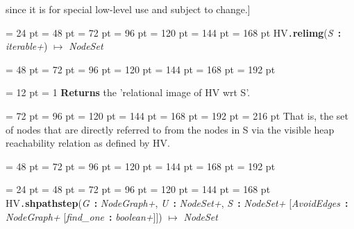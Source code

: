 {{{{{{since it is for special low-level use and subject to change.]
\par}
\par}
\par}
\par}
\par}
{\par \noindent  \leftskip = 24 pt  \leftmargini = 48 pt  \leftmarginii = 72 pt  \leftmarginiii = 96 pt  \leftmarginiv = 120 pt  \leftmarginv = 144 pt  \leftmarginvi = 168 pt HV{\tt .\/}{\bf {\large {\bf relimg\/}}\/}({\em S\/}~{\bf :}  {\em iterable+\/}) \(\mapsto \)  {\em NodeSet\/}{\par \noindent
{\par \noindent  \leftskip = 48 pt  \leftmargini = 72 pt  \leftmarginii = 96 pt  \leftmarginiii = 120 pt  \leftmarginiv = 144 pt  \leftmarginv = 168 pt  \leftmarginvi = 192 pt {\par \noindent
{\par \pagebreak[3.100000] \noindent \hangindent = 12 pt \hangafter = 1 
{\bf Returns \/} the 'relational image of HV wrt S'.\par}
{\par \noindent  \leftskip = 72 pt  \leftmargini = 96 pt  \leftmarginii = 120 pt  \leftmarginiii = 144 pt  \leftmarginiv = 168 pt  \leftmarginv = 192 pt  \leftmarginvi = 216 pt  That is, the set of nodes
that are directly referred to from the nodes in S via the visible heap
reachability relation as defined by HV.\par}
\par}
\par}
{\par \noindent  \leftskip = 48 pt  \leftmargini = 72 pt  \leftmarginii = 96 pt  \leftmarginiii = 120 pt  \leftmarginiv = 144 pt  \leftmarginv = 168 pt  \leftmarginvi = 192 pt {\par \noindent
\par}
\par}
\par}
\par}
{\par \noindent  \leftskip = 24 pt  \leftmargini = 48 pt  \leftmarginii = 72 pt  \leftmarginiii = 96 pt  \leftmarginiv = 120 pt  \leftmarginv = 144 pt  \leftmarginvi = 168 pt HV{\tt .\/}{\bf {\large {\bf shpathstep\/}}\/}({\em G\/}~{\bf :}  {\em NodeGraph+\/}, {\em U\/}~{\bf :}  {\em NodeSet+\/}, {\em S\/}~{\bf :}  {\em NodeSet+\/}  {[}{\em AvoidEdges\/}~{\bf :}  {\em NodeGraph+\/}  {[}{\em find{\_}one\/}~{\bf :}  {\em boolean+\/}]]) \(\mapsto \)  {\em NodeSet\/}{\par \noindent
}}}
